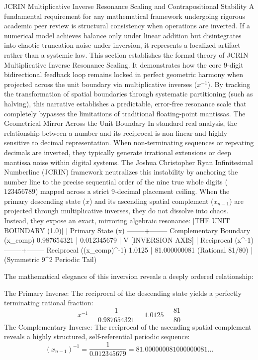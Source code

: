 JCRIN Multiplicative Inverse Resonance Scaling and Contrapositional Stability
A fundamental requirement for any mathematical framework undergoing rigorous academic peer review is structural consistency when operations are inverted. If a numerical model achieves balance only under linear addition but disintegrates into chaotic truncation noise under inversion, it represents a localized artifact rather than a systemic law.
This section establishes the formal theory of JCRIN Multiplicative Inverse Resonance Scaling. It demonstrates how the core 9-digit bidirectional feedback loop remains locked in perfect geometric harmony when projected across the unit boundary via multiplicative inverses ($x^{-1}$). By tracking the transformation of spatial boundaries through systematic partitioning (such as halving), this narrative establishes a predictable, error-free resonance scale that completely bypasses the limitations of traditional floating-point mantissas.
The Geometrical Mirror Across the Unit Boundary
In standard real analysis, the relationship between a number and its reciprocal is non-linear and highly sensitive to decimal representation. When non-terminating sequences or repeating decimals are inverted, they typically generate irrational extensions or deep mantissa noise within digital systems.
The Joshua Christopher Ryan Infinitesimal Numberline (JCRIN) framework neutralizes this instability by anchoring the number line to the precise sequential order of the nine true whole digits ($123456789$) mapped across a strict 9-decimal placement ceiling.
When the primary descending state ($x$) and its ascending spatial complement ($x_{n-1}$) are projected through multiplicative inverses, they do not dissolve into chaos. Instead, they expose an exact, mirroring algebraic resonance:
                  [THE UNIT BOUNDARY (1.0)]
                             |
   Primary State (x) --------+-------- Complementary Boundary (x_comp)
     0.987654321             |           0.012345679
                             |
                             V
                     [INVERSION AXIS]
                             |
   Reciprocal (x^-1) --------+-------- Reciprocal ((x_comp)^-1)
     1.0125                  |           81.000000081
  (Rational 81/80)           |        (Symmetric 9^2 Periodic Tail)


The mathematical elegance of this inversion reveals a deeply ordered relationship:

The Primary Inverse: The reciprocal of the descending state yields a perfectly terminating rational fraction:
$$x^{-1} = \frac{1}{0.987654321} = 1.0125 = \frac{81}{80}$$ 
The Complementary Inverse: The reciprocal of the ascending spatial complement reveals a highly structured, self-referential periodic sequence:
$$(x_{n-1})^{-1} = \frac{1}{0.012345679} = 81.000000081000000081\dots$$ 

